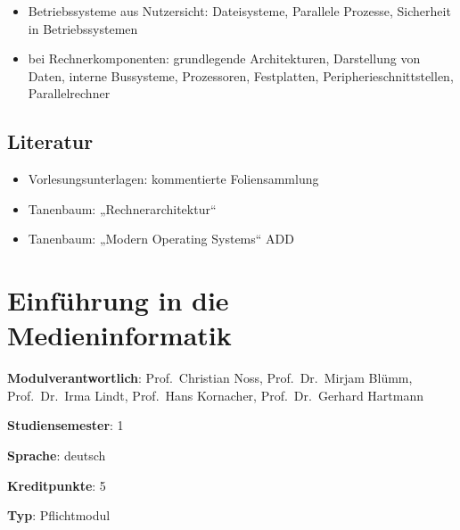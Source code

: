 \begin{itemize}
\tightlist
\item
  Betriebssysteme aus Nutzersicht: Dateisysteme, Parallele Prozesse,
  Sicherheit in Betriebssystemen
\item
  bei Rechnerkomponenten: grundlegende Architekturen, Darstellung von
  Daten, interne Bussysteme, Prozessoren, Festplatten,
  Peripherieschnittstellen, Parallelrechner
\end{itemize}

\hypertarget{literaturpathlabelmi-2017modulbeschreibungen-bachelorba_einfhrunginbetriebssystemeundrechnerarchitektur}{%
\section*{Literatur\label{/mi-2017/modulbeschreibungen-bachelor/BA_EinfhrunginBetriebssystemeundRechnerarchitektur}}\label{literaturpathlabelmi-2017modulbeschreibungen-bachelorba_einfhrunginbetriebssystemeundrechnerarchitektur}}

\begin{itemize}
\tightlist
\item
  Vorlesungsunterlagen: kommentierte Foliensammlung
\item
  Tanenbaum: „Rechnerarchitektur``
\item
  Tanenbaum: „Modern Operating Systems`` ADD
\end{itemize}

\hypertarget{einfuxfchrung-in-die-medieninformatikpathlabelmi-2017modulbeschreibungen-bachelorba_einfhrungindiemedieninformatik}{%
\chapter{Einführung in die
Medieninformatik\label{/mi-2017/modulbeschreibungen-bachelor/BA_EinfhrungindieMedieninformatik}}\label{einfuxfchrung-in-die-medieninformatikpathlabelmi-2017modulbeschreibungen-bachelorba_einfhrungindiemedieninformatik}}

\begin{modulHead}
\textbf{Modulverantwortlich}: Prof.~Christian Noss,
Prof.~Dr.~Mirjam Blümm, Prof.~Dr.~Irma Lindt, Prof.~Hans Kornacher,
Prof.~Dr.~Gerhard
Hartmann
\end{modulHead}
\begin{modulHead}
\textbf{Studiensemester}:
1
\end{modulHead}
\begin{modulHead}
\textbf{Sprache}:
deutsch
\end{modulHead}
\begin{modulHead}
\textbf{Kreditpunkte}:
5
\end{modulHead}
\begin{modulHead}
\textbf{Typ}:
Pflichtmodul
\end{modulHead}


